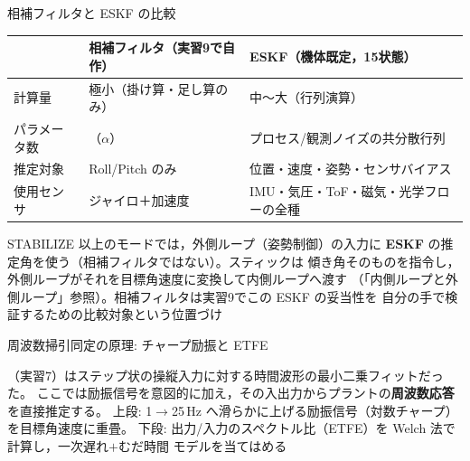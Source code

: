 \begin{frame}{相補フィルタと ESKF の比較\later}
  \begin{table}
    \centering\footnotesize
    \begin{tabular}{l >{\raggedright\arraybackslash}p{45mm} >{\raggedright\arraybackslash}p{45mm}}
      \hline
      & \textbf{相補フィルタ（実習9で自作）} & \textbf{ESKF（機体既定，15状態）} \\
      \hline
      計算量     & 極小（掛け算・足し算のみ） & 中〜大（行列演算） \\
      パラメータ数 & 1（$\alpha$） & プロセス/観測ノイズの共分散行列 \\
      推定対象   & Roll/Pitch のみ & 位置・速度・姿勢・センサバイアス \\
      使用センサ & ジャイロ＋加速度 & IMU・気圧・ToF・磁気・光学フローの全種 \\
      \hline
    \end{tabular}
  \end{table}

  \vspace{0.5em}

  {\footnotesize STABILIZE 以上のモードでは，外側ループ（姿勢制御）の入力に
  \textbf{ESKF} の推定角を使う（相補フィルタではない）。スティックは
  傾き角そのものを指令し，外側ループがそれを目標角速度に変換して内側ループへ渡す
  （「内側ループと外側ループ」参照）。相補フィルタは実習9でこの ESKF の妥当性を
  自分の手で検証するための比較対象という位置づけ}
\end{frame}


\begin{frame}{周波数掃引同定の原理: チャープ励振と ETFE\later}
  \begin{center}
  \end{center}

  {\footnotesize {}（実習7）はステップ状の操縦入力に対する時間波形の最小二乗フィットだった。
  ここでは励振信号を意図的に加え，その入出力からプラントの\textbf{周波数応答}を直接推定する。
  上段: 1$\to$25\,Hz へ滑らかに上げる励振信号（対数チャープ）を目標角速度に重畳。
  下段: 出力/入力のスペクトル比（ETFE）を Welch 法で計算し，一次遅れ$+$むだ時間
  モデルを当てはめる}
\end{frame}

